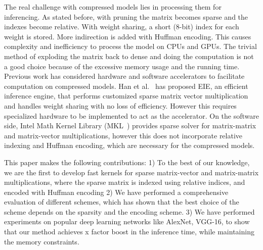 The real challenge with compressed models lies in processing them for inferencing.
As stated before, with pruning the matrix becomes sparse and the indexes become relative. 
With weight sharing,  a short (8-bit) index for each weight is stored. More indirection is added with Huffman encoding.
This causes complexity and inefficiency to process the model on CPUs and GPUs.
The trivial method of exploding the matrix back to dense and doing the computation is not a good choice because of the 
excessive memory usage and the running time. 
Previous work has considered hardware and software accelerators to facilitate computation on compressed models.
Han et  al.~\cite{HanLMPPHD16} has proposed EIE, an efficient inference engine, that performs
customized sparse matrix vector multiplication and handles weight sharing with no loss of efficiency. 
However this requires  specialized hardware to be implemented to act as the accelerator. On the software side,
Intel Math Kernel Library (MKL~\cite{mkl}) provides  sparse solver for matrix-matrix and matrix-vector multiplications,
however this does not incorporate relative indexing and Huffman encoding, which are necessary for the compressed models.

 
This paper makes the following contributions: 
1) To the best of our knowledge, we are the first to develop fast kernels for sparse matrix-vector and matrix-matrix multiplications, where the 
sparse matrix is indexed using relative indices, and encoded with Huffman encoding
2) We have performed a comprehensive evaluation of different schemes,  which has shown that the best choice of the scheme depends on the
sparsity and the encoding scheme.
3) We have performed experiments on popular deep learning networks like AlexNet, VGG-16, to show that our method achieves x factor boost in 
the inference time, while maintaining the memory constraints.





 
 














